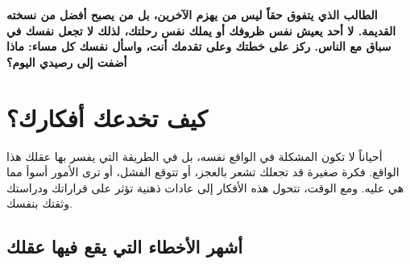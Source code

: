\documentclass[12pt,a4paper]{book}
\newcommand{\importantAr}[1]{%
	\begin{important}
		\bfseries #1
	\end{important}
}
\begin{document}
\importantAr{
	الطالب الذي يتفوق حقاً ليس من يهزم الآخرين، بل من يصبح أفضل من نسخته القديمة. لا أحد يعيش نفس ظروفك أو يملك نفس رحلتك، لذلك لا تجعل نفسك في سباق مع الناس. ركز على خطتك وعلى تقدمك أنت، واسأل نفسك كل مساء: ماذا أضفت إلى رصيدي اليوم؟
}
	\section{كيف تخدعك أفكارك؟}
	\label{sec:reprogram-mind}
	
	أحياناً لا تكون المشكلة في الواقع نفسه، بل في الطريقة التي يفسر بها عقلك هذا الواقع. فكرة صغيرة قد تجعلك تشعر بالعجز، أو تتوقع الفشل، أو ترى الأمور أسوأ مما هي عليه. ومع الوقت، تتحول هذه الأفكار إلى عادات ذهنية تؤثر على قراراتك ودراستك وثقتك بنفسك.
	
	\subsection{أشهر الأخطاء التي يقع فيها عقلك}
	\label{subsec:ten-distortions}
	
\end{document}
